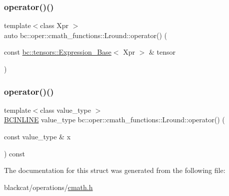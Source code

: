 \mbox{\label{structbc_1_1oper_1_1cmath__functions_1_1Lround_a3ce80332b0dadcd7fd5c6828428d8c7b}} 
\subsubsection{\texorpdfstring{operator()()}{operator()()}\hspace{0.1cm}{\footnotesize\ttfamily [2/3]}}
{\footnotesize\ttfamily template$<$class Xpr $>$ \\
auto bc\+::oper\+::cmath\+\_\+functions\+::\+Lround\+::operator() (\begin{DoxyParamCaption}\item[{const \hyperlink{classbc_1_1tensors_1_1Expression__Base}{bc\+::tensors\+::\+Expression\+\_\+\+Base}$<$ Xpr $>$ \&}]{tensor }\end{DoxyParamCaption})\hspace{0.3cm}{\ttfamily [inline]}}

\mbox{\label{structbc_1_1oper_1_1cmath__functions_1_1Lround_a3034b00ef54dc823c2aa96adc59d0f9e}} 
\subsubsection{\texorpdfstring{operator()()}{operator()()}\hspace{0.1cm}{\footnotesize\ttfamily [3/3]}}
{\footnotesize\ttfamily template$<$class value\+\_\+type $>$ \\
\hyperlink{common_8h_a6699e8b0449da5c0fafb878e59c1d4b1}{B\+C\+I\+N\+L\+I\+NE} value\+\_\+type bc\+::oper\+::cmath\+\_\+functions\+::\+Lround\+::operator() (\begin{DoxyParamCaption}\item[{const value\+\_\+type \&}]{x }\end{DoxyParamCaption}) const\hspace{0.3cm}{\ttfamily [inline]}}



The documentation for this struct was generated from the following file\+:\begin{DoxyCompactItemize}
\item 
blackcat/operations/\hyperlink{cmath_8h}{cmath.\+h}\end{DoxyCompactItemize}
